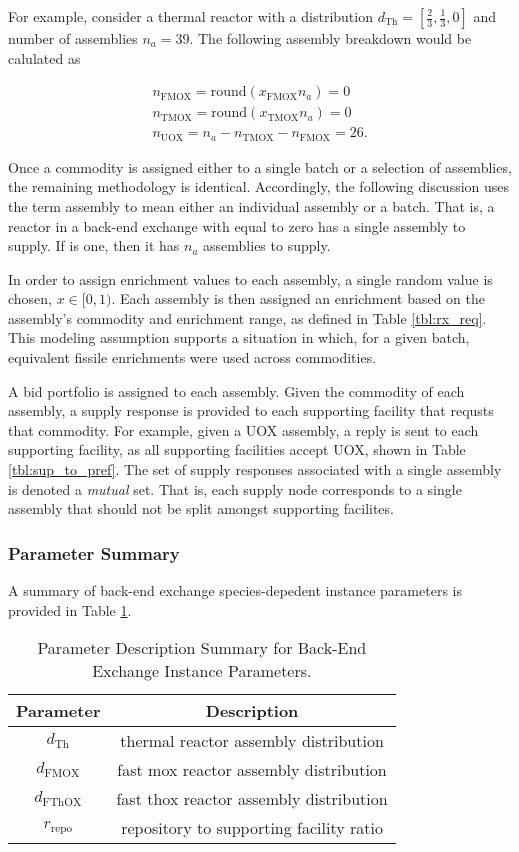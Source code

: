 For example, consider a thermal reactor with a distribution $d_{\text{Th}} =
[\frac{2}{3}, \frac{1}{3}, 0]$ and number of assemblies $n_a = 39$. The
following assembly breakdown would be calulated as

\begin{gather*}
n_{\text{FMOX}} = \text{round}(x_{\text{FMOX}} n_a) = 0 \\
n_{\text{TMOX}} = \text{round}(x_{\text{TMOX}} n_a) = 0 \\
n_{\text{UOX}} = n_a - n_{\text{TMOX}} - n_{\text{FMOX}} = 26.
\end{gather*}

Once a commodity is assigned either to a single batch or a selection of
assemblies, the remaining methodology is identical. Accordingly, the following
discussion uses the term assembly to mean either an individual assembly or a
batch. That is, a reactor in a back-end exchange with \frx equal to zero has
a single assembly to supply. If \frx is one, then it has $n_a$ assemblies to
supply.

In order to assign enrichment values to each assembly, a single random value is
chosen, $x \in [0, 1)$. Each assembly is then assigned an enrichment based on
  the assembly's commodity and enrichment range, as defined in Table
  \ref{tbl:rx_req}. This modeling assumption supports a situation in which, for
  a given batch, equivalent fissile enrichments were used across commodities.

A bid portfolio is assigned to each assembly. Given the commodity of each
assembly, a supply response is provided to each supporting facility that requsts
that commodity. For example, given a UOX assembly, a reply is sent to each
supporting facility, as all supporting facilities accept UOX, shown in Table
\ref{tbl:sup_to_pref}. The set of supply responses associated with a single
assembly is denoted a \textit{mutual} set. That is, each supply node corresponds
to a single assembly that should not be split amongst supporting facilites.

\subsubsection{Parameter Summary}

A summary of back-end exchange species-depedent instance parameters is provided
in Table \ref{tbl:back_params}.

\begin{table}[h!]
\centering
\caption{Parameter Description Summary for Back-End Exchange Instance
  Parameters.}
\label{tbl:back_params}
\begin{tabular}{|c|c|}
\hline
Parameter    & 
Description
\\ \hline
$d_{\text{Th}}$     & 
thermal reactor assembly distribution
\\ \hline
$d_{\text{FMOX}}$     & 
fast mox reactor assembly distribution
\\ \hline
$d_{\text{FThOX}}$     & 
fast thox reactor assembly distribution
\\ \hline
$r_{\text{repo}}$     & 
repository to supporting facility ratio
\\ \hline
\end{tabular}
\end{table}
